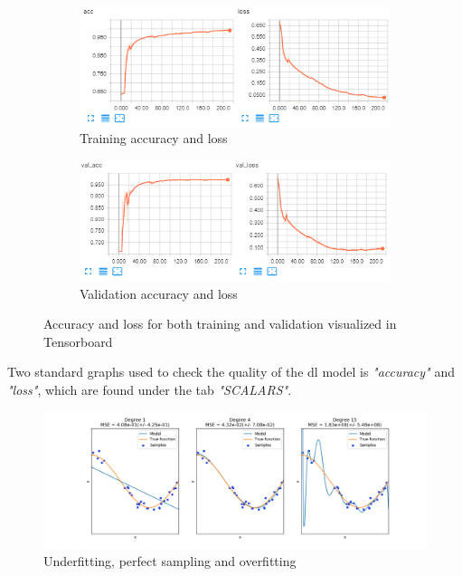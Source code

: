 \documentclass[USenglish]{ifimaster}  %
\begin{document}
\begin{figure}[ht]
\centering
\begin{subfigure}[b]{\textwidth}
\centering
\includegraphics[width=1\textwidth]{bilder/tensorboard_acc.png}
\caption{Training accuracy and loss}
\end{subfigure}
\hfill
\begin{subfigure}[b]{\textwidth}
\centering
\includegraphics[width=1\textwidth]{bilder/tensorboard_val_acc.png}
\caption{Validation accuracy and loss}
\end{subfigure}
\caption{Accuracy and loss for both training and validation visualized in Tensorboard}
\label{fig:accuracy_loss}
\end{figure}
Two standard graphs used to check the quality of the \ac{dl} model is \textit{"accuracy"} and \textit{"loss"}, which are found under the tab \textit{"SCALARS"}. 
\begin{figure}[ht]
    \centering
    \includegraphics[width=1\textwidth]{bilder/overfitting_underfitting.png}
    \caption{Underfitting, perfect sampling and overfitting \cite{website:overfitting_underfitting}}
    \label{fig:overfitting_underfitting}
\end{figure}
\end{document}
